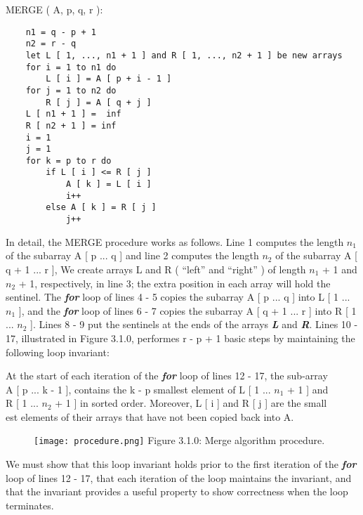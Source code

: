 {{\bfseries\color{Violet}{function}} MERGE ( A, p, q, r ):
\begin{lstlisting}
	n1 = q - p + 1
	n2 = r - q
	let L [ 1, ..., n1 + 1 ] and R [ 1, ..., n2 + 1 ] be new arrays
	for i = 1 to n1 do
		L [ i ] = A [ p + i - 1 ]
	for j = 1 to n2 do 
		R [ j ] = A [ q + j ]
	L [ n1 + 1 ] =  inf
	R [ n2 + 1 ] = inf
	i = 1
	j = 1
	for k = p to r do
		if L [ i ] <= R [ j ]
			A [ k ] = L [ i ]
			i++
		else A [ k ] = R [ j ]
			j++
\end{lstlisting} \hfill

In detail, the MERGE procedure works as follows. Line 1 computes the length $n_{1}$ of the subarray A [ p ... q ] and line 2 computes the length $n_{2}$ of the subarray A [ q + 1 ... r ], We create arrays L and R ( “left” and “right” ) of length $n_{1}$ + 1 and $n_{2}$ + 1, respectively, in line 3; the extra position in each array will hold the sentinel. The {\bfseries\itshape for} loop of lines 4 - 5 copies the subarray A [ p ... q ] into L [ 1 ... $n_{1}$ ], and the {\bfseries\itshape for} loop of lines 6 - 7 copies the subarray A [ q + 1 ... r ] into R [ 1 ... $n_{2}$ ]. Lines 8 - 9 put the sentinels at the ends of the arrays {\bfseries\itshape L} and {\bfseries\itshape R}. Lines 10 - 17, illustrated in Figure 3.1.0, performes r - p + 1 basic steps by maintaining the following loop invariant: 

\begin{center}
At the start of each iteration of the {\bfseries\itshape for} loop of lines 12 - 17, the sub-array \\ A [ p ... k - 1 ], contains the k - p smallest element of L [ 1 ... $n_{1}$ + 1 ] and \\ R [ 1 ... $n_{2}$ + 1 ] in sorted order. Moreover, L [ i ] and R [ j ] are the small\\est elements of their arrays that have not been copied back into A. \\
\end{center}

\begin{figure}[H]
\texttt{[image: procedure.png]}
\centering \linebreak \linebreak Figure 3.1.0: Merge algorithm procedure.
\end{figure} 

We must show that this loop invariant holds prior to the first iteration of the {\bfseries\itshape for} loop of lines 12 - 17, that each iteration of the loop maintains the invariant, and that the invariant provides a useful property to show correctness when the loop terminates. 

}
